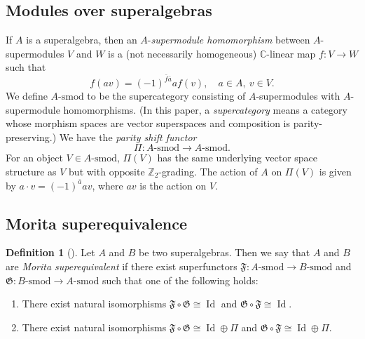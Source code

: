 \documentclass[11pt]{amsart}
\theoremstyle{definition}
\newtheorem{defn}[theo]{Definition}
\numberwithin{equation}{section}
\begin{document}
\subsection{Modules over superalgebras}

If \(A\) is a superalgebra, then an $ A $-\emph{supermodule homomorphism} between \(A\)-supermodules \(V\) and \(W\) is a (not necessarily homogeneous) $ \mathbb{C} $-linear map $ f : V \rightarrow W $ such that
\begin{equation*}
f(av) = (-1)^{\bar{f}\bar{a}} af(v), \quad a \in A, \ v \in V.
\end{equation*}
We define $ A\text{-smod} $ to be the supercategory consisting of $ A $-supermodules with $ A $-supermodule homomorphisms. (In this paper, a \emph{supercategory} means a category whose morphism spaces are vector superspaces and composition is parity-preserving.) We have the \emph{parity shift functor}
\begin{equation*}
\Pi \colon A\text{-smod} \rightarrow A\text{-smod}.
\end{equation*}
For an object $ V \in A\text{-smod} $, $ \Pi(V) $ has the same underlying vector space structure as $ V $ but with opposite $ \mathbb{Z}_{2} $-grading. The action of $ A $ on $ \Pi(V) $ is given by $ a \cdot v = (-1)^{\bar{a}}av $, where $ av $ is the action on $ V $.


\subsection{Morita superequivalence} \label{Morita_superequivalence}


\begin{defn}[{\cite[§7.2]{Wang-Zhao}}] \label{Morita_sup}
Let \(A\) and \(B\) be two superalgebras. Then we say that \(A\) and \(B\) are \emph{Morita superequivalent} if there exist superfunctors $ \mathfrak{F} \colon A\text{-smod} \rightarrow B\text{-smod} $ and $ \mathfrak{G} \colon B\text{-smod} \rightarrow A\text{-smod} $ such that one of the following holds:
\begin{enumerate}[label=\roman*)]
\item There exist natural isomorphisms $ \mathfrak{F} \circ \mathfrak{G} \cong \operatorname{Id} $ and $ \mathfrak{G} \circ \mathfrak{F} \cong \operatorname{Id} $. \label{one}
\item There exist natural isomorphisms $ \mathfrak{F} \circ \mathfrak{G} \cong \operatorname{Id} \oplus \Pi $ and $ \mathfrak{G} \circ \mathfrak{F} \cong \operatorname{Id} \oplus \Pi $.
\end{enumerate}
\end{defn}
\end{document}
